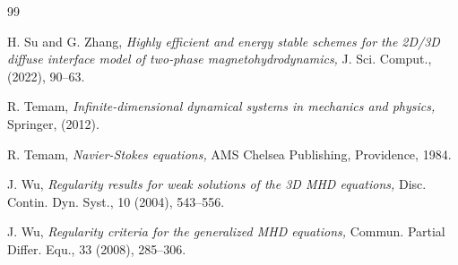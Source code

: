 \documentclass[11pt]{article}
\numberwithin{equation}{section}
\begin{document}
\begin{center}
\begin{thebibliography}{99}





H. Su and G. Zhang,  {\it Highly efficient and energy stable schemes for the 2D/3D diffuse interface model of two-phase magnetohydrodynamics,} J. Sci. Comput., (2022), 90--63.

R. Temam, {\it Infinite-dimensional dynamical systems in mechanics and physics,}  Springer, (2012).

 R. Temam, {\it Navier-Stokes equations,}
AMS Chelsea Publishing, Providence, 1984.


 J. Wu, {\it Regularity results for weak solutions of the 3D MHD equations,}
Disc. Contin. Dyn. Syst., 10 (2004), 543--556.

 J. Wu, {\it Regularity criteria  for the generalized MHD equations,}
Commun. Partial Differ. Equ.,  33 (2008), 285--306.





\end{thebibliography}
\end{center}
\end{document}
